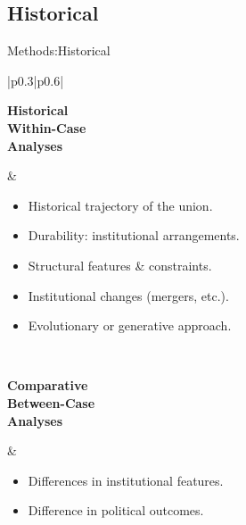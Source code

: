 \documentclass{beamer}
\begin{document}
\subsection{Historical}
\begin{frame}{Methods:Historical}
\setlength{\arrayrulewidth}{0.0pt} %
\begin{tabular}{|p{0.3\textwidth}|p{0.6\textwidth}|}
\hline
\begin{minipage}[t][0.2\textheight][t]{\linewidth}
\textbf{Historical\\
Within-Case\\
Analyses}
\end{minipage}
&
\begin{itemize}
    \item Historical trajectory of the union.
    \item Durability: institutional arrangements.
    \item Structural features \& constraints.
    \item Institutional changes (mergers, etc.).
    \item Evolutionary or generative approach. %
\end{itemize}
\\
\hline
\begin{minipage}[c][0.2\textheight][b]{\linewidth}
\textbf{Comparative\\
Between-Case\\
Analyses}
\end{minipage}
&
\begin{itemize}
    \item Differences in institutional features.
    \item Difference in political outcomes.
\end{itemize}
\\
\hline
\end{tabular}
\end{frame}
\end{document}
